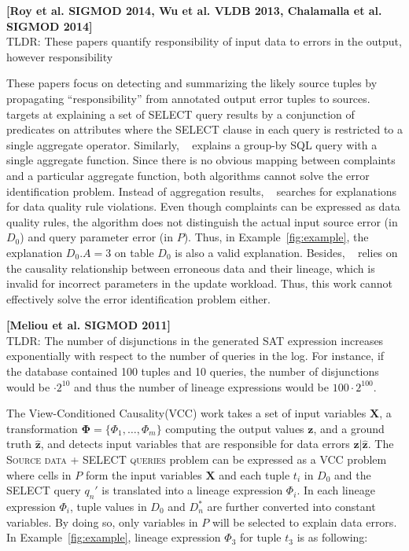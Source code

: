 \noindent \textbf{[Roy et al. SIGMOD 2014, Wu et al. VLDB 2013, Chalamalla et al. SIGMOD 2014]} \\
TLDR: These papers quantify responsibility of input data to errors in the
output, however responsibility


These papers focus on detecting and summarizing the likely source tuples by
propagating ``responsibility'' from annotated output error tuples to sources.
~\cite{Wu13} targets at explaining a set of SELECT query results by a
conjunction of predicates on attributes where the SELECT clause in each query
is restricted to a single aggregate operator. Similarly, ~\cite{roy2014formal}
explains a group-by SQL query with a single aggregate function. Since there is
no obvious mapping between complaints and a particular aggregate function,
both algorithms cannot solve the error identification problem. Instead of
aggregation results, ~\cite{chalamalla2014} searches for explanations for data
quality rule violations. Even though complaints can be expressed as data
quality rules, the algorithm does not distinguish the actual input source
error (in $D_0$) and query parameter error (in $P$). Thus, in
Example~\ref{fig:example}, the explanation $D_0.A = 3$ on table $D_0$ is also
a valid explanation. Besides, ~\cite{chalamalla2014} relies on the causality
relationship between erroneous data and their lineage, which is invalid for
incorrect parameters in the update workload. Thus, this work cannot
effectively solve the error identification problem either.

\noindent \textbf{[Meliou et al. SIGMOD 2011]} \\
TLDR: The number of disjunctions in the generated SAT expression increases
exponentially with respect to the number of queries in the log. For instance,
if the database contained 100 tuples and 10 queries, the number of
disjunctions would be $\cdot 2^{10}$ and thus the number of lineage
expressions would be $100\cdot 2^{100}$.

The View-Conditioned Causality(VCC) work takes a set of input variables
$\mathbf{X}$, a transformation $\mathbf{\Phi} =\{\Phi_1, \dots , \Phi_m\}$
computing the output values $\mathbf{z}$, and a ground truth
$\hat{\mathbf{z}}$, and detects input variables that are responsible for data
errors $\mathbf{z}|\hat{\mathbf{z}}$. The \textsc{Source data + SELECT
queries} problem can be expressed as a VCC problem where cells in $P$ form the
input variables $\mathbf{X}$ and each tuple $t_i$ in $D_0$ and the SELECT
query $q_n'$ is translated into a lineage expression $\Phi_i$. In each lineage
expression $\Phi_i$, tuple values in $D_0$ and $D_n^*$ are further converted
into constant variables. By doing so, only variables in $P$ will be selected
to explain data errors. In Example~\ref{fig:example}, lineage expression
$\Phi_3$ for tuple $t_3$ is as following:

